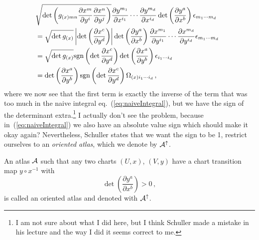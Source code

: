             \begin{align}
                \nonumber &\sqrt{\det\left( g_{(x)mn}\frac{\partial x^m}{\partial y^i}\frac{\partial x^n}{\partial y^j} \right)}
                \frac{\partial y^{m_1}}{\partial x^{i_1}}\cdots \frac{\partial y^{m_d}}{\partial x^{i_d}}
                \det\left( \frac{\partial y^a}{\partial x^b} \right) \epsilon_{m_1\cdots m_d} \MoveEqLeft[2]\\
                \nonumber &= 
                \sqrt{\det g_{(x)}} \left| \det \left( \frac{\partial x^c}{\partial y^d} \right)\right|
                \det\left( \frac{\partial y^a}{\partial x^b} \right)
                \frac{\partial x^{m_1}}{\partial y^{i_1}}\cdots \frac{\partial x^{m_d}}{\partial y^{i_d}}
                \epsilon_{m_1\cdots m_d}\\
                \nonumber&=  \sqrt{\det g_{(x)}} 
                \mathrm{sgn}\left( \det \frac{\partial x^c}{\partial y^d} \right) 
                \det \left( \frac{\partial x^a}{\partial y^b}\right)
                \epsilon_{i_1\cdots i_d}\\
                &= 
                \det \left( \frac{\partial x^a}{\partial y^b}\right)
                \mathrm{sgn}\left( \det \frac{\partial x^c}{\partial y^d} \right) 
                \Omega_{(x)i_1\cdots i_d}\,,
                \label{eq:OmegaTransform}
            \end{align}
            where we now see that the first term is exactly the inverse of the term that was too much in
            the naive integral eq.~(\ref{eq:naiveIntegral}),
            but we have the sign of the determinant extra.\footnote{I am not sure about what I did here, but I think
            Schuller made a mistake in his lecture and the way I did it seems correct to me.}
            I actually don't see the problem, because in~(\ref{eq:naiveIntegral}) we also have an
            absolute value sign which should make it okay again?
            Nevertheless, Schuller states that we want the sign to be 1,
            restrict ourselves to an \textit{oriented atlas}, which we denote by
            $\mathcal{A}^\uparrow$.

            \begin{defn}
                An atlas $\mathcal{A}$ such that any two charts $(U,x)$, $(V,y)$ have
                a chart transition map $y\circ x^{-1}$ with
                \begin{equation}
                    \det\left( \frac{\partial y^a}{\partial x^b} \right) > 0\,,
                \end{equation}
                is called an oriented atlas and denoted with $\mathcal{A}^\uparrow$.
            \end{defn}

